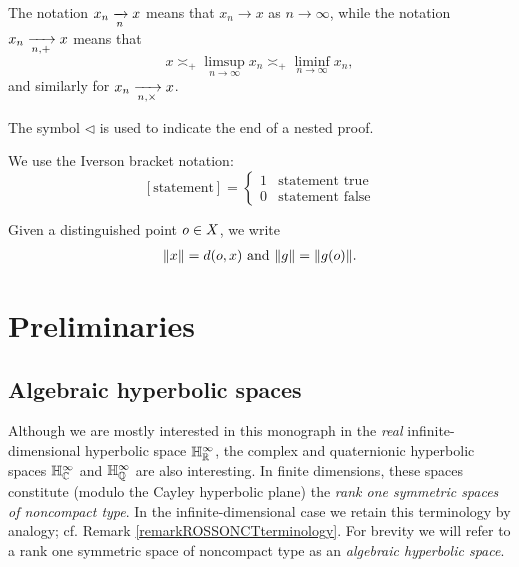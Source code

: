 \begin{convention}
\label{conventiontendston}
The notation $x_n\xrightarrow[n]{} x$ means that $x_n\to x$ as $n\to \infty$, while the notation $x_n\xrightarrow[n,+]{} x$ means that
\[
x \asymp_\plus \limsup_{n\to\infty}x_n \asymp_\plus \liminf_{n\to\infty} x_n,
\]
and similarly for $x_n\xrightarrow[n,\times]{} x$.
\end{convention}

\begin{convention}
The symbol $\triangleleft$ is used to indicate the end of a nested proof.
\end{convention}

\begin{convention}
We use the Iverson bracket notation: 
$$[\text{statement}] = \begin{cases} 1 & \text{statement true} \\ 0 & \text{statement false} \end{cases}$$
\end{convention}

\begin{convention}
Given a distinguished point $o\in X$, we write
\begin{align*}
\|x\| = d(o,x) \textup{ and } \|g\| = \|g(o)\|.
\end{align*}
\end{convention}



\section{Preliminaries}
\subsection{Algebraic hyperbolic spaces}

Although we are mostly interested in this monograph in the \emph{real} infinite-dimensional hyperbolic space $\H_\R^\infty$, the complex and quaternionic hyperbolic spaces $\H_\C^\infty$ and $\H_\Q^\infty$ are also interesting. In finite dimensions, these spaces constitute (modulo the Cayley hyperbolic plane) the \emph{rank one symmetric spaces of noncompact type}. In the infinite-dimensional case we retain this terminology by analogy; cf. Remark \ref{remarkROSSONCTterminology}. For brevity we will refer to a rank one symmetric space of noncompact type as an {\it algebraic hyperbolic space}.

